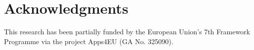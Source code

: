 \documentclass[runningheads,a4paper]{../../Tools/LaTEX/llncs}
\begin{document}

\section*{Acknowledgments}
This research has been partially funded by the European Union's 7th Framework Programme via the project Apps4EU (GA No. 325090).
\vspace{0.5cm}


\end{document}
